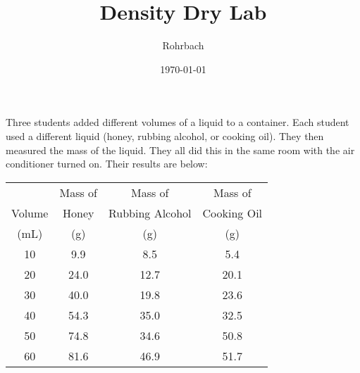 \documentclass[10pt]{exam}
\title{Density Dry Lab}
\author{Rohrbach}
\date{\today}
\begin{document}
\maketitle

\noindent
Three students added different volumes of a liquid to a container.  Each student used a different liquid (honey, rubbing alcohol, or cooking oil).  They then measured the mass of the liquid.  They all did this in the same room with the air conditioner turned on.  Their results are below:

\vspace{1em}

\begin{tabular}{cccc}
  \hline
  	     & Mass of & Mass of         & Mass of     \\
  Volume & Honey	 & Rubbing Alcohol & Cooking Oil \\
  (mL)   &  (g)    &  (g)            &    (g)      \\
  \hline
  10 &  9.9	&  8.5 &  5.4 \\
  20 & 24.0	& 12.7 & 20.1 \\
  30 & 40.0	& 19.8 & 23.6 \\
  40 & 54.3	& 35.0 & 32.5 \\
  50 & 74.8	& 34.6 & 50.8 \\
  60 & 81.6	& 46.9 & 51.7 \\
  \hline\hline
\end{tabular}
\end{document}

